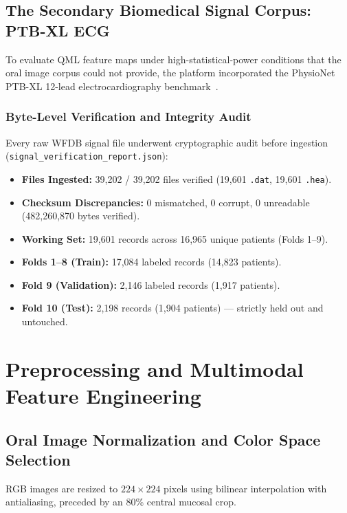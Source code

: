 \documentclass[11pt,a4paper]{report}
\newcommand{\artifact}[1]{\texttt{\footnotesize #1}}
\begin{document}
\section{The Secondary Biomedical Signal Corpus: PTB-XL ECG}
To evaluate QML feature maps under high-statistical-power conditions that the oral image corpus could not provide, the platform incorporated the PhysioNet PTB-XL 12-lead electrocardiography benchmark~\cite{wagner2020ptbxl}.

\subsection{Byte-Level Verification and Integrity Audit}
Every raw WFDB signal file underwent cryptographic audit before ingestion (\artifact{signal\_verification\_report.json}):
\begin{itemize}
  \item \textbf{Files Ingested:} 39,202 / 39,202 files verified (19,601 \texttt{.dat}, 19,601 \texttt{.hea}).
  \item \textbf{Checksum Discrepancies:} 0 mismatched, 0 corrupt, 0 unreadable (482,260,870 bytes verified).
  \item \textbf{Working Set:} 19,601 records across 16,965 unique patients (Folds 1--9).
  \item \textbf{Folds 1--8 (Train):} 17,084 labeled records (14,823 patients).
  \item \textbf{Fold 9 (Validation):} 2,146 labeled records (1,917 patients).
  \item \textbf{Fold 10 (Test):} 2,198 records (1,904 patients) --- strictly held out and untouched.
\end{itemize}

\chapter{Preprocessing and Multimodal Feature Engineering}

\section{Oral Image Normalization and Color Space Selection}
RGB images are resized to $224 \times 224$ pixels using bilinear interpolation with antialiasing, preceded by an 80\% central mucosal crop. 
\end{document}
